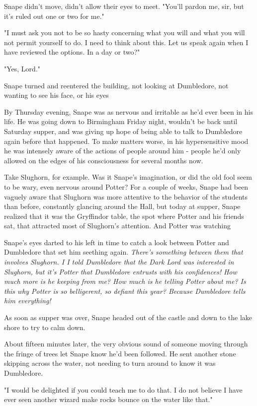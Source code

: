 Snape didn't move, didn't allow their eyes to meet. "You'll pardon me, sir, but it's ruled out one or two for me."

"I must ask you not to be so hasty concerning what you will and what you will not permit yourself to do. I need to think about this. Let us speak again when I have reviewed the options. In a day or two?"

"Yes, Lord."

Snape turned and reentered the building, not looking at Dumbledore, not wanting to see his face, or his eyes{\el}

By Thursday evening, Snape was as nervous and irritable as he'd ever been in his life. He was going down to Birmingham Friday night, wouldn't be back until Saturday supper, and was giving up hope of being able to talk to Dumbledore again before that happened. To make matters worse, in his hypersensitive mood he was intensely aware of the actions of people around him - people he'd only allowed on the edges of his consciousness for several months now.

Take Slughorn, for example. Was it Snape's imagination, or did the old fool seem to be wary, even nervous around Potter? For a couple of weeks, Snape had been vaguely aware that Slughorn was more attentive to the behavior of the students than before, constantly glancing around the Hall, but today at supper, Snape realized that it was the Gryffindor table, the spot where Potter and his friends sat, that attracted most of Slughorn's attention. And Potter was watching{\el}

Snape's eyes darted to his left in time to catch a look between Potter and Dumbledore that set him seething again. \emph{There's something between them that involves Slughorn. I{\el} I told Dumbledore that the Dark Lord was interested in Slughorn, but it's Potter that Dumbledore entrusts with his confidences! How much more is he keeping from me? How much is he telling Potter about me? Is this why Potter is so belligerent, so defiant this year? Because Dumbledore tells him everything!}

As soon as supper was over, Snape headed out of the castle and down to the lake shore to try to calm down.

About fifteen minutes later, the very obvious sound of someone moving through the fringe of trees let Snape know he'd been followed. He sent another stone skipping across the water, not needing to turn around to know it was Dumbledore.

"I would be delighted if you could teach me to do that. I do not believe I have ever seen another wizard make rocks bounce on the water like that."


